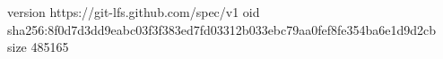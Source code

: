 version https://git-lfs.github.com/spec/v1
oid sha256:8f0d7d3dd9eabc03f3f383ed7fd03312b033ebc79aa0fef8fe354ba6e1d9d2cb
size 485165
